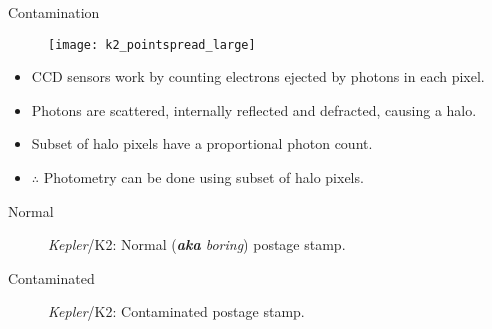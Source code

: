 \documentclass[10pt]{beamer}
\begin{document}
	\begin{frame}{Contamination}
		\begin{overlayarea}{\textwidth}{.5\textheight}
			\begin{figure}
				\centering
					\texttt{[image: k2\_pointspread\_large]}
			\end{figure}
		\end{overlayarea}

		\vfill

		\begin{itemize}
			\item CCD sensors work by counting electrons ejected by photons in each pixel.
			\item Photons are scattered, internally reflected and defracted, causing a halo.
			\item Subset of halo pixels have a proportional photon count.
			\item {\Large $\therefore$} Photometry can be done using subset of halo pixels.
		\end{itemize}
	\end{frame}

	\begin{frame}{Normal}
		\begin{figure}
			\centering
			\caption{\textit{Kepler}/K2: Normal (\textit{\textbf{aka} boring}) postage stamp.}
		\end{figure}
	\end{frame}

	\begin{frame}{Contaminated}
		\begin{figure}
			\centering
			\caption{\textit{Kepler}/K2: Contaminated postage stamp.}
		\end{figure}
	\end{frame}
\end{document}
